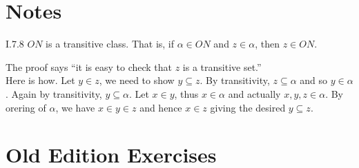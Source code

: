 % 


\section{Notes}

\begin{manuallemma}{I.7.8}
\(ON\) is a transitive class. That is, if \(\alpha \in ON\)
and \(z \in \alpha\),
then \(z \in ON\).
\end{manuallemma}
The proof says ``it is easy to check that $z$ is a transitive set.''
\\
Here is how. Let \(y \in z\), we need to show \(y \subseteq z\).
By transitivity, \(z \subseteq \alpha\) and so \(y \in \alpha\).
Again by transitivity, \(y \subseteq \alpha\).
Let \(x\in y\), thus \(x \in \alpha\) and actually \(x,y,z \in \alpha\).
By orering of \(\alpha\), we have \(x\in y \in z\) and hence \(x\in z\)
giving the desired \(y \subseteq z\).

\section{Old Edition Exercises } %


